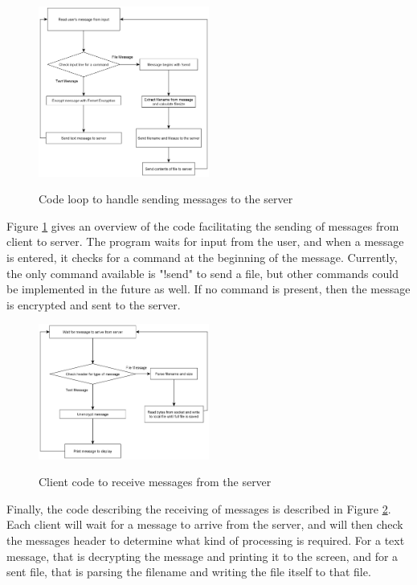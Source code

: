 \documentclass{article}
\begin{document}
\begin{figure}[h]
\caption{Code loop to handle sending messages to the server}
\centering
\includegraphics[width=0.5\textwidth]{media/clientFlowchart1.png}
\label{client1}
\end{figure}

Figure \ref{client1} gives an overview of the code facilitating the sending of messages from client to server. The program waits for input from the user, and when a message is entered, it checks for a command at the beginning of the message. Currently, the only command available is "!send" to send a file, but other commands could be implemented in the future as well. If no command is present, then the message is encrypted and sent to the server.

\begin{figure}[h]
\caption{Client code to receive messages from the server}
\centering
\includegraphics[width=0.5\textwidth]{media/clientFlowchart3.png}
\label{client3}
\end{figure}

Finally, the code describing the receiving of messages is described in Figure \ref{client3}. Each client will wait for a message to arrive from the server, and will then check the messages header to determine what kind of processing is required. For a text message, that is decrypting the message and printing it to the screen, and for a sent file, that is parsing the filename and writing the file itself to that file.
\end{document}
